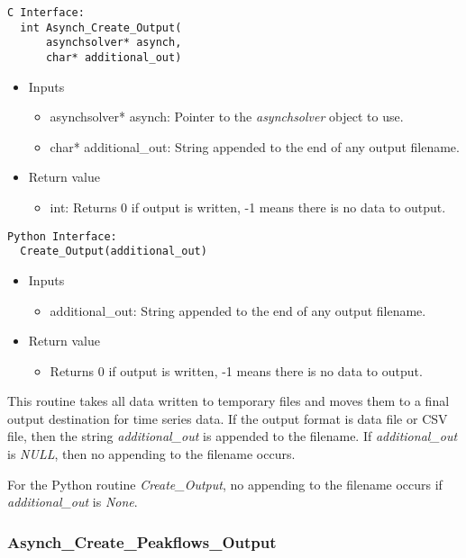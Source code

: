 \documentclass[12pt]{article}
\begin{document}
\begin{lstlisting}[style=CStyle]
  C Interface:
  int Asynch_Create_Output(
      asynchsolver* asynch,
      char* additional_out)
\end{lstlisting}
\begin{itemize}
 \item Inputs
  \begin{itemize}
   \item asynchsolver* asynch: Pointer to the \emph{asynchsolver} object to use.
   \item char* additional\_out: String appended to the end of any output filename.
  \end{itemize}
 \item Return value
  \begin{itemize}
   \item int: Returns 0 if output is written, -1 means there is no data to output.
  \end{itemize}
\end{itemize}
\begin{lstlisting}[style=PythonStyle]
  Python Interface:
  Create_Output(additional_out)
\end{lstlisting}
\begin{itemize}
 \item Inputs
  \begin{itemize}
   \item additional\_out: String appended to the end of any output filename.
  \end{itemize}
 \item Return value
  \begin{itemize}
   \item Returns 0 if output is written, -1 means there is no data to output.
  \end{itemize}
\end{itemize}
This routine takes all data written to temporary files and moves them to a final output destination for time series data. If the output format is data file or CSV file, then the string \emph{additional\_out} is appended to the filename. If \emph{additional\_out} is \emph{NULL}, then no appending to the filename occurs.

For the Python routine \emph{Create\_Output}, no appending to the filename occurs if \emph{additional\_out} is \emph{None}.



\subsubsection{Asynch\_Create\_Peakflows\_Output} \label{sec: asynch_create_peakflows_output}
\end{document}
